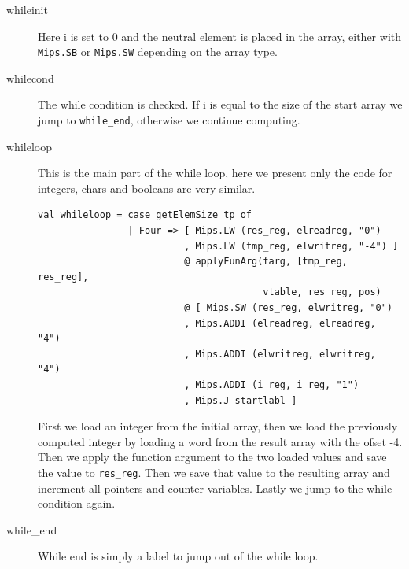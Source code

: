 \documentclass[11pt]{article}
\begin{document}
\begin{description}
        \item [whileinit] Here i is set to 0 and the neutral element is placed
            in the array, either with \texttt{Mips.SB} or \texttt{Mips.SW}
            depending on the array type.

        \item [whilecond] The while condition is checked.  If i is equal to the
            size of the start array we jump to \texttt{while\_end}, otherwise
            we continue computing.

        \item [whileloop] This is the main part of the while loop, here we
            present only the code for integers, chars and booleans are very
            similar.

            \begin{lstlisting}
val whileloop = case getElemSize tp of
                | Four => [ Mips.LW (res_reg, elreadreg, "0")
                          , Mips.LW (tmp_reg, elwritreg, "-4") ]
                          @ applyFunArg(farg, [tmp_reg, res_reg],
                                        vtable, res_reg, pos)
                          @ [ Mips.SW (res_reg, elwritreg, "0")
                          , Mips.ADDI (elreadreg, elreadreg, "4")
                          , Mips.ADDI (elwritreg, elwritreg, "4")
                          , Mips.ADDI (i_reg, i_reg, "1")
                          , Mips.J startlabl ]
            \end{lstlisting}

            First we load an integer from the initial array, then we load the
            previously computed integer by loading a word from the result array
            with the ofset -4.  Then we apply the function argument to the two
            loaded values and save the value to \texttt{res\_reg}.  Then we save
            that value to the resulting array and increment all pointers and
            counter variables.  Lastly we jump to the while condition again.

        \item [while\_end] While end is simply a label to jump out of the while
            loop.
    \end{description}
\end{document}
